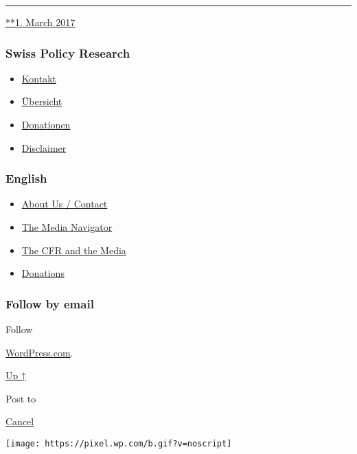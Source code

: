 \begin{center}\rule{0.5\linewidth}{\linethickness}\end{center}

\href{https://swprs.org/2017/03/01/medien-in-deutschland/}{**1. March
2017}

\hypertarget{swiss-policy-research}{%
\subsubsection{Swiss Policy Research}\label{swiss-policy-research}}

\begin{itemize}
\tightlist
\item
  \href{https://swprs.org/kontakt/}{Kontakt}
\item
  \href{https://swprs.org/uebersicht/}{Übersicht}
\item
  \href{https://swprs.org/donationen/}{Donationen}
\item
  \href{https://swprs.org/disclaimer/}{Disclaimer}
\end{itemize}

\hypertarget{english}{%
\subsubsection{English}\label{english}}

\begin{itemize}
\tightlist
\item
  \href{https://swprs.org/contact/}{About Us / Contact}
\item
  \href{https://swprs.org/media-navigator/}{The Media Navigator}
\item
  \href{https://swprs.org/the-american-empire-and-its-media/}{The CFR
  and the Media}
\item
  \href{https://swprs.org/donations/}{Donations}
\end{itemize}

\hypertarget{follow-by-email}{%
\subsubsection{Follow by email}\label{follow-by-email}}

Follow

\href{https://wordpress.com/?ref=footer_custom_com}{WordPress.com}.

\protect\hyperlink{}{Up ↑}

Post to

\protect\hyperlink{}{Cancel}

\texttt{[image: https://pixel.wp.com/b.gif?v=noscript]}

